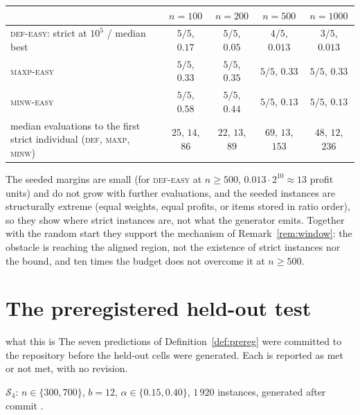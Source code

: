 \documentclass[a4paper,11pt]{article}
\newcommand{\code}[1]{\path{#1}}
\newcommand{\DEF}{\textsc{def}}
\newcommand{\MAXP}{\textsc{maxp}}
\newcommand{\MINW}{\textsc{minw}}
\theoremstyle{plain}
\theoremstyle{definition}
\theoremstyle{remark}
\begin{document}
\begin{center}\small
\begin{tabular}{@{}lcccc@{}}
\toprule
& $n=100$ & $n=200$ & $n=500$ & $n=1000$ \\
\midrule
\DEF-\textsc{easy}: strict at $10^{5}$ / median best & $5/5$, $0.17$ & $5/5$, $0.05$ & $4/5$, $0.013$ & $3/5$, $0.013$ \\
\MAXP-\textsc{easy} & $5/5$, $0.33$ & $5/5$, $0.35$ & $5/5$, $0.33$ & $5/5$, $0.33$ \\
\MINW-\textsc{easy} & $5/5$, $0.58$ & $5/5$, $0.44$ & $5/5$, $0.13$ & $5/5$, $0.13$ \\
median evaluations to the first strict individual (\DEF, \MAXP, \MINW) & $25$, $14$, $86$ & $22$, $13$, $89$ & $69$, $13$, $153$ & $48$, $12$, $236$ \\
\bottomrule
\end{tabular}
\end{center}

The seeded margins are small (for \DEF-\textsc{easy} at $n\ge500$, $0.013\cdot2^{10}\approx13$
profit units) and do not grow with further evaluations, and the seeded instances are
structurally extreme (equal weights, equal profits, or items stored in ratio order), so they
show where strict instances are, not what the generator emits. Together with the random
start they support the mechanism of Remark~\ref{rem:window}: the obstacle is reaching the
aligned region, not the existence of strict instances nor the bound, and ten times the budget
does not overcome it at $n\ge500$.

\section{The preregistered held-out test}\label{sec:prereg-results}

\begin{plain}{what this is}
The seven predictions of Definition~\ref{def:prereg} were committed to the repository before
the held-out cells were generated. Each is reported as met or not met, with no revision.
\end{plain}

$\mathcal S_4$: $n\in\{300,700\}$, $b=12$, $\alpha\in\{0.15,0.40\}$, $1\,920$ instances,
generated after commit \code{be8b79e}.
\end{document}
